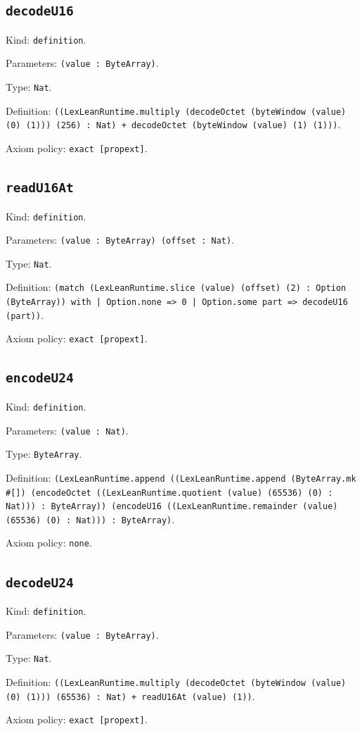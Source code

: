 \documentclass[11pt]{article}
\begin{document}
\subsection*{\texttt{decodeU16}}
\noindent Kind: \texttt{definition}.\par
\noindent Parameters: \texttt{(value : ByteArray)}.\par
\noindent Type: \texttt{Nat}.\par
\noindent Definition: \texttt{((LexLeanRuntime.multiply (decodeOctet (byteWindow (value) (0) (1))) (256) : Nat) + decodeOctet (byteWindow (value) (1) (1)))}.\par
\noindent Axiom policy: \texttt{exact [propext]}.\par
\subsection*{\texttt{readU16At}}
\noindent Kind: \texttt{definition}.\par
\noindent Parameters: \texttt{(value : ByteArray) (offset : Nat)}.\par
\noindent Type: \texttt{Nat}.\par
\noindent Definition: \texttt{(match (LexLeanRuntime.slice (value) (offset) (2) : Option (ByteArray)) with | Option.none => 0 | Option.some part => decodeU16 (part))}.\par
\noindent Axiom policy: \texttt{exact [propext]}.\par
\subsection*{\texttt{encodeU24}}
\noindent Kind: \texttt{definition}.\par
\noindent Parameters: \texttt{(value : Nat)}.\par
\noindent Type: \texttt{ByteArray}.\par
\noindent Definition: \texttt{(LexLeanRuntime.append ((LexLeanRuntime.append (ByteArray.mk \#[]) (encodeOctet ((LexLeanRuntime.quotient (value) (65536) (0) : Nat))) : ByteArray)) (encodeU16 ((LexLeanRuntime.remainder (value) (65536) (0) : Nat))) : ByteArray)}.\par
\noindent Axiom policy: \texttt{none}.\par
\subsection*{\texttt{decodeU24}}
\noindent Kind: \texttt{definition}.\par
\noindent Parameters: \texttt{(value : ByteArray)}.\par
\noindent Type: \texttt{Nat}.\par
\noindent Definition: \texttt{((LexLeanRuntime.multiply (decodeOctet (byteWindow (value) (0) (1))) (65536) : Nat) + readU16At (value) (1))}.\par
\noindent Axiom policy: \texttt{exact [propext]}.\par
\end{document}
